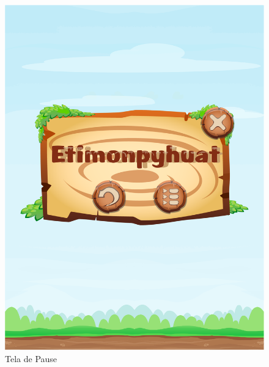 \documentclass[12pt]{article}
\begin{document}
		\begin{figure}[!htb]
			\centering
			\includegraphics[width=\linewidth]{img/pause.png}
			\caption{Tela de Pause}\label{fig:exampleFig11}
			\endminipage \hspace{0.5cm}

\end{figure}
\end{document}
